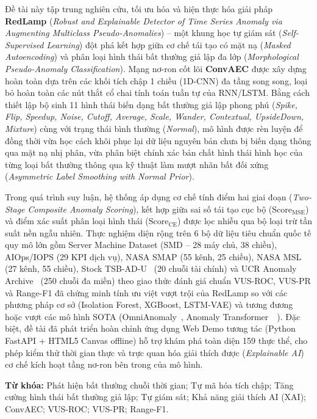 \documentclass[11pt,journal,onecolumn]{IEEEtran}
\begin{document}
Đề tài này tập trung nghiên cứu, tối ưu hóa và hiện thực hóa giải pháp \textbf{RedLamp} (\textit{Robust and Explainable Detector of Time Series Anomaly via Augmenting Multiclass Pseudo-Anomalies}) -- một khung học tự giám sát (\textit{Self-Supervised Learning}) đột phá kết hợp giữa cơ chế tái tạo có mặt nạ (\textit{Masked Autoencoding}) và phân loại hình thái bất thường giả lập đa lớp (\textit{Morphological Pseudo-Anomaly Classification}). Mạng nơ-ron cốt lõi \textbf{ConvAEC} được xây dựng hoàn toàn dựa trên các khối tích chập 1 chiều (1D-CNN) đa tầng song song, loại bỏ hoàn toàn các nút thắt cổ chai tính toán tuần tự của RNN/LSTM. Bằng cách thiết lập bộ sinh 11 hình thái biến dạng bất thường giả lập phong phú (\textit{Spike, Flip, Speedup, Noise, Cutoff, Average, Scale, Wander, Contextual, UpsideDown, Mixture}) cùng với trạng thái bình thường (\textit{Normal}), mô hình được rèn luyện để đồng thời vừa học cách khôi phục lại dữ liệu nguyên bản chưa bị biến dạng thông qua mặt nạ nhị phân, vừa phân biệt chính xác bản chất hình thái hình học của từng loại bất thường thông qua kỹ thuật làm mượt nhãn bất đối xứng (\textit{Asymmetric Label Smoothing with Normal Prior}).

Trong quá trình suy luận, hệ thống áp dụng cơ chế tính điểm hai giai đoạn (\textit{Two-Stage Composite Anomaly Scoring}), kết hợp giữa sai số tái tạo cục bộ ($\text{Score}_{\text{MSE}}$) và điểm xác suất phân loại hình thái ($\text{Score}_{\text{CE}}$) được lọc nhiễu qua bộ loại trừ tần suất nền ngẫu nhiên. Thực nghiệm diện rộng trên 6 bộ dữ liệu tiêu chuẩn quốc tế quy mô lớn gồm Server Machine Dataset (SMD -- 28 máy chủ, 38 chiều), AIOps/IOPS (29 KPI dịch vụ), NASA SMAP (55 kênh, 25 chiều), NASA MSL (27 kênh, 55 chiều), Stock TSB-AD-U~\cite{paparrizos2022tsb} (20 chuỗi tài chính) và UCR Anomaly Archive~\cite{dau2019ucr} (250 chuỗi đa miền) theo giao thức đánh giá chuẩn VUS-ROC, VUS-PR và Range-F1 đã chứng minh tính ưu việt vượt trội của RedLamp so với các phương pháp cơ sở (Isolation Forest, XGBoost, LSTM-VAE) và tương đương hoặc vượt các mô hình SOTA (OmniAnomaly~\cite{su2019robust}, Anomaly Transformer~\cite{xu2022anomaly}~\cite{xu2022anomaly}). Đặc biệt, đề tài đã phát triển hoàn chỉnh ứng dụng Web Demo tương tác (Python FastAPI + HTML5 Canvas offline) hỗ trợ khám phá toàn diện 159 thực thể, cho phép kiểm thử thời gian thực và trực quan hóa giải thích được (\textit{Explainable AI}) cơ chế kích hoạt tầng nơ-ron bên trong của mô hình.

\vspace{0.5cm}
\noindent\textbf{Từ khóa:} Phát hiện bất thường chuỗi thời gian; Tự mã hóa tích chập; Tăng cường hình thái bất thường giả lập; Tự giám sát; Khả năng giải thích AI (XAI); ConvAEC; VUS-ROC; VUS-PR; Range-F1.
\end{document}
